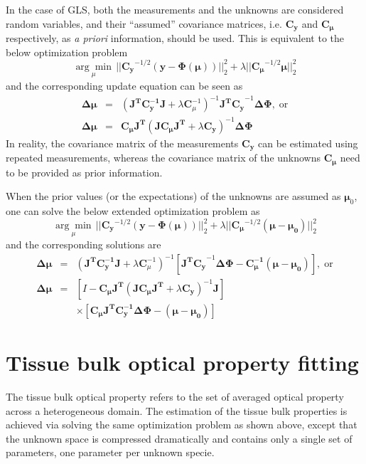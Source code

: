 \documentclass[12pt]{book}               %
\begin{document}
In the case of GLS, both the measurements and the unknowns are considered random variables, and their ``assumed'' covariance matrices, i.e. $\mathbf{C_y}$ and $\mathbf{C_\mu}$ respectively, as \emph{a priori} information, should be used. This is equivalent to the below optimization problem
\begin{equation}
\underset{\mu}{\arg\min} \, || \mathbf{C_y}^{-1/2}\left(\boldsymbol{y-\Phi(\mu)}\right) ||^2_2 + \lambda|| \mathbf{C_\mu}^{-1/2}\boldsymbol{\mu} ||^2_2
\end{equation}
and the corresponding update equation can be seen as
\begin{eqnarray}
\mathbf{\Delta\mu}&=&(\mathbf{J^TC_y^{-1}J}+\lambda \mathbf{C}_\mu^{-1})^{-1}\mathbf{J^TC_y}^{-1}\mathbf{\Delta\Phi},\;\mathrm{or}\label{eq:overgls}\\
\mathbf{\Delta\mu}&=&\mathbf{C_\mu J^T}(\mathbf{JC_\mu J^T}+\lambda \mathbf{C_y})^{-1}\mathbf{\Delta\Phi}\label{eq:undergls}
\end{eqnarray}
In reality, the covariance matrix of the measurements $\mathbf{C_y}$ can be estimated using repeated measurements, whereas the covariance matrix of the unknowns $\mathbf{C_\mu}$ need to be provided as prior information.

When the prior values (or the expectations) of the unknowns are assumed as $\boldsymbol\mu_0$, one can solve the below extended optimization problem as
\begin{equation}\label{eq:objfunglsprior}
\underset{\mu}{\arg\min} \, || \mathbf{C_y}^{-1/2}\left(\boldsymbol{y-\Phi(\mu)}\right) ||^2_2 + \lambda|| \mathbf{C_\mu}^{-1/2}(\boldsymbol{\mu-\mu_0}) ||^2_2
\end{equation}
and the corresponding solutions are
\begin{eqnarray}
\mathbf{\Delta\mu}&=&(\mathbf{J^TC_y^{-1}J}+\lambda \mathbf{C}_\mu^{-1})^{-1}\left[\mathbf{J^TC_y}^{-1}\mathbf{\Delta\Phi} - \boldsymbol{C_\mu^{-1}(\mu-\mu_0)}\right],\;\mathrm{or}\label{eq:overglsprior}\\\nonumber
\mathbf{\Delta\mu}&=&\left[ I - \mathbf{C_\mu J^T}(\mathbf{JC_\mu J^T}+\lambda \mathbf{C_y})^{-1}\mathbf{J}\right] \\
 && \times\left[\mathbf{C_\mu J^TC_y^{-1}\Delta\Phi} - \boldsymbol{(\mu - \mu_0)}\right]\label{eq:underglsprior}
\end{eqnarray}

\section{Tissue bulk optical property fitting}\label{sec:bulkfitting}
The tissue bulk optical property refers to the set of averaged optical property across a heterogeneous domain. The estimation of the tissue bulk properties is achieved via solving the same optimization problem as shown above, except that the unknown space is compressed dramatically and contains only a single set of parameters, one parameter per unknown specie. 
\end{document}
